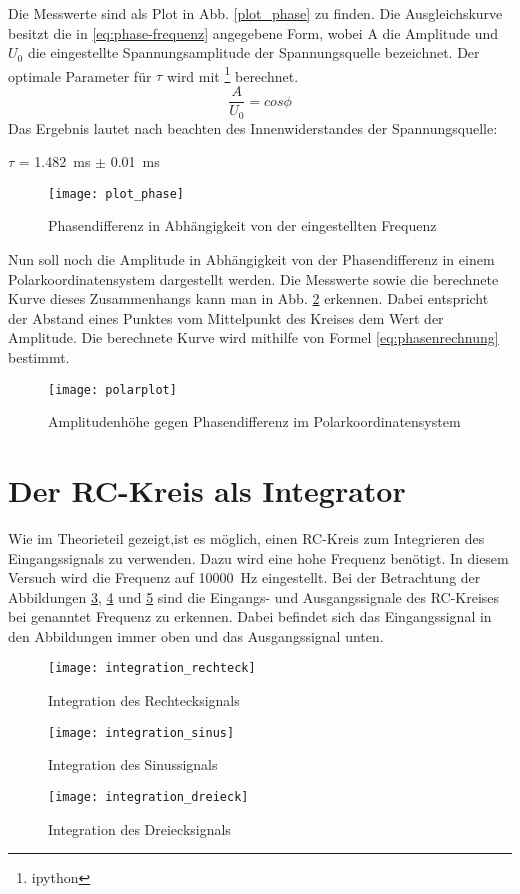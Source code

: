 Die Messwerte sind als Plot in Abb. \ref{plot_phase} zu finden. Die Ausgleichskurve besitzt die in \eqref{eq:phase-frequenz} angegebene Form, wobei A die Amplitude und $U_0$ die eingestellte Spannungsamplitude der Spannungsquelle bezeichnet. Der optimale Parameter für $\tau$ wird mit \footnote{ipython} berechnet.
\begin{equation}
\label{eq:phase_frequenz}
\frac{A}{U_0}=cos{\phi}
\end{equation}
Das Ergebnis lautet nach beachten des Innenwiderstandes der Spannungsquelle:
\begin{center}
$\tau$ = \SI{1.482}{\milli\second} $\pm$ \SI{0.01}{\milli\second}
\end{center}
\begin{figure}
\centering
\texttt{[image: plot\_phase]}
\caption{Phasendifferenz in Abhängigkeit von der eingestellten Frequenz}
\label{fig:plot_phase}
\end{figure}
Nun soll noch die Amplitude in Abhängigkeit von der Phasendifferenz in einem Polarkoordinatensystem dargestellt werden. Die Messwerte sowie die berechnete Kurve dieses Zusammenhangs kann man in Abb. \ref{fig:polarplot} erkennen. Dabei entspricht der Abstand eines Punktes vom Mittelpunkt des Kreises dem Wert der Amplitude. Die berechnete Kurve wird mithilfe von Formel \eqref{eq:phasenrechnung} bestimmt.
\begin{figure}
\centering
\texttt{[image: polarplot]}
\caption{Amplitudenhöhe gegen Phasendifferenz im Polarkoordinatensystem}
\label{fig:polarplot}
\end{figure}
\section{Der RC-Kreis als Integrator}
Wie im Theorieteil gezeigt,ist es möglich, einen RC-Kreis zum Integrieren des Eingangssignals zu verwenden. Dazu wird eine hohe Frequenz benötigt. In diesem Versuch wird die Frequenz auf \SI{10000}{\hertz} eingestellt. Bei der Betrachtung der Abbildungen \ref{fig:integration_rechteck}, \ref{fig:integration_sinus} und \ref{fig:integration_dreieck} sind die Eingangs- und Ausgangssignale des RC-Kreises bei genanntet Frequenz zu erkennen. Dabei befindet sich das Eingangssignal in den Abbildungen immer oben und das Ausgangssignal unten.
\begin{figure}
\centering
\texttt{[image: integration\_rechteck]}
\caption{Integration des Rechtecksignals}
\label{fig:integration_rechteck}
\end{figure}
\begin{figure}
\centering
\texttt{[image: integration\_sinus]}
\caption{Integration des Sinussignals}
\label{fig:integration_sinus}
\end{figure}
\begin{figure}
\centering
\texttt{[image: integration\_dreieck]}
\caption{Integration des Dreiecksignals}
\label{fig:integration_dreieck}
\end{figure}